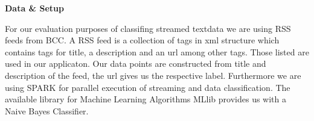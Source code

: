 \begin{center} \textbf{\huge Data \& Setup} \end{center}
For our evaluation purposes of classifing streamed textdata we are using RSS feeds from BCC. A RSS feed is a collection of tags in xml structure which contains tags for title, a description and an url among other tags. Those listed are used in our applicaton. Our data points are constructed from title and description of the feed, the url gives us the respective label. Furthermore we are using SPARK for parallel execution of streaming and data classification. The available library for Machine Learning Algorithms MLlib provides us with a Naive Bayes Classifier.\\
  

